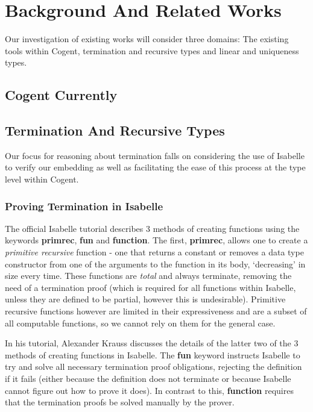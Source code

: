 \chapter{Background And Related Works}\label{ch:background}
Our investigation of existing works will consider three domains: The existing tools within Cogent,
termination and recursive types and linear and uniqueness types.

\section{Cogent Currently}

\section{Termination And Recursive Types}
Our focus for reasoning about termination falls on considering the use of Isabelle to verify our 
embedding as well as facilitating the ease of this process at the type level within Cogent. 

\subsection{Proving Termination in Isabelle}

The official Isabelle tutorial\citep{IsabelleTutorial} describes 3 methods of creating functions using the keywords 
\textbf{primrec}, \textbf{fun} and \textbf{function}. The first, \textbf{primrec}, allows one to create a 
\textit{primitive recursive} function - one that returns a constant or removes a data type constructor from one
of the arguments to the function in its body, `decreasing' in size every time. These functions are \textit{total}
and always terminate, removing the need of a termination proof (which is required for all functions within Isabelle,
unless they are defined to be partial, however this is undesirable).
Primitive recursive functions however are limited in their expressiveness and are a subset of all computable
functions, so we cannot rely on them for the general case.

In his tutorial\citep{KraussIsabelle}, Alexander Krauss discusses the details of the latter two of the 3 methods
of creating functions in Isabelle. The \textbf{fun} keyword instructs Isabelle to try and solve all necessary
termination proof obligations, rejecting the definition if it fails (either because the definition does not 
terminate or because Isabelle cannot figure out how to prove it does). In contrast to this, \textbf{function}
requires that the termination proofs be solved manually by the prover.

